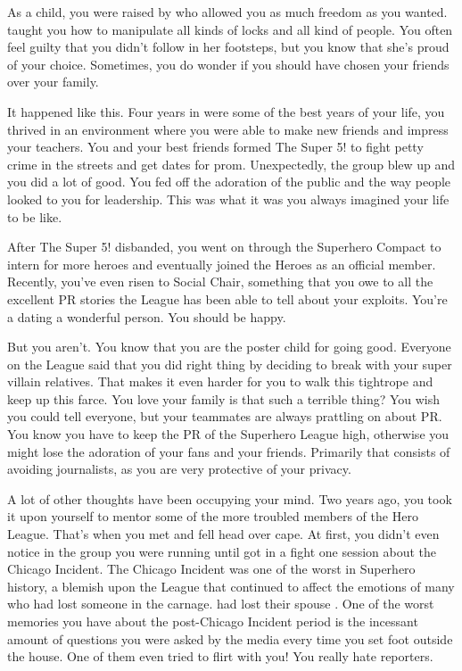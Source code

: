 \documentclass[char]{LRSguildcamp1}
\begin{document}
\name{\cYoungest{}}

As a child, you were raised by \cGrandma{} who allowed you as much freedom as you wanted. \cGrandma{} taught you how to manipulate all kinds of locks and all kind of people. You often feel guilty that you didn't follow in her footsteps, but you know that she's proud of your choice. Sometimes, you do wonder if you should have chosen your friends over your family. 

It happened like this. Four years in \pSuperSchool{} were some of the best years  of your life, you thrived in an environment where you were able to make new friends and impress your teachers. You and your best friends formed The Super 5! to fight petty crime in the streets and get dates for prom. Unexpectedly, the group blew up and you did a lot of good. You fed off the adoration of the public and the way people looked to you for leadership. This was what it was you always imagined your life to be like.  
 
After The Super 5! disbanded, you went on through the Superhero Compact to intern for more heroes and eventually joined the Heroes as an official member. Recently, you've even risen to Social Chair, something that you owe to all the excellent PR stories the League has been able to tell about your exploits. You're a dating a wonderful person. You should be happy. 

But you aren't. You know that you are the poster child for going good.  Everyone on the League said that you did right thing by deciding to break with your super villain relatives. That makes it even harder for you to walk this tightrope and keep up this farce. You love your family is that such a terrible thing? You wish you could tell everyone, but your teammates are always prattling on about PR. You know you have to keep the PR of the Superhero League high, otherwise you might lose the adoration of your fans and your friends. Primarily that consists of avoiding journalists, as you are very protective of your privacy. 

A lot of other thoughts have been occupying your mind. Two years ago, you took it upon yourself to mentor some of the more troubled members of the Hero League. That's when you met \cYS{} and fell head over cape. At first, you didn't even notice \cYS{} in the group you were running until \cYS{} got in a fight one session about the Chicago Incident. The Chicago Incident was one of the worst in Superhero history, a blemish upon the League that continued to affect the emotions of many who had lost someone in the carnage. \cArchitect{} had lost their spouse \cAS{}. One of the worst memories you have about the post-Chicago Incident period is the incessant amount of questions you were asked by the media every time you set foot outside the house. One of them even tried to flirt with you! You really hate reporters. 
\end{document}
